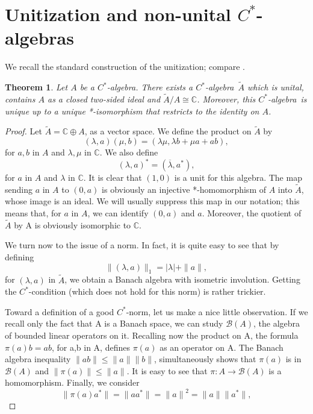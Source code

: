\documentclass{book}
\newtheorem{theorem}[definition]{Theorem}
\def\cstar{\(C^*\)-algebra}
\begin{document}
\section{Unitization and non-unital
\texorpdfstring{\(C^*\)}{C*}-algebras}
\label{sec:adjoiningUnit}
We recall the standard construction of the unitization; compare
\cite[Paragraph~A.1.2]{RordamLarsenLaustsen2000}.
\begin{theorem}\label{theorem:181}
  Let \(A\) be a \cstar. There exists a \cstar\ \(\tilde{A} \) which
  is unital, contains \(A\) as a closed two-sided ideal and \(\tilde{A}/A \cong \mathbb{C}\). Moreover,
  this \cstar\ is unique up to a unique *-isomorphism that restricts to the identity on \(A\).
\end{theorem}
\begin{proof}
  Let \(\tilde{A} = \mathbb{C}\oplus A\), as a vector space. We define the product on \(\tilde{A}\) by
  \[(\lambda, a)(\mu,b) = (\lambda\mu,\lambda b + \mu a +ab),\]
  for \(a,b\) in \(A\) and \(\lambda,\mu\) in \(\mathbb{C}\). We also define
  \[{(\lambda, a)}^* = (\overline{\lambda},a^*),\]
  for \(a\) in \(A\) and \(\lambda\) in \(\mathbb{C}\). It is clear that \((1,0)\) is a unit for this algebra. The
  map sending \(a\) in \(A\) to \((0,a)\) is obviously an injective *-homomorphism of
  \(A\) into \(\tilde{A}\), whose image is an ideal. We will usually suppress this map in
  our notation; this means that, for \(a\) in \(A\), we can identify \((0,a)\) and \(a\).
  Moreover, the quotient of \(\tilde{A}\) by A is obviously isomorphic to \(\mathbb{C}\).\par
  We turn now to the issue of a norm. In fact, it is quite easy to see that
  by defining
  \[\|(\lambda, a)\|_1 = |\lambda|+ \|a\| ,\]
  for \((\lambda,a)\) in \(\tilde{A}\), we obtain a Banach algebra with isometric involution. Getting
  the \(C^*\)-condition (which does not hold for this norm) is rather trickier.\par
  Toward a definition of a good \(C^*\)-norm, let us make a nice little observation. 
  If we recall only the fact that A is a Banach space, we can study \(\mathcal{B}(A)\),
  the algebra of bounded linear operators on it. Recalling now the product on
  A, the formula \(\pi(a)b = ab\), for a,b in A, defines \(\pi(a)\) as an operator on A.
  The Banach algebra inequality \(\|ab\| \leq \|a\| \|b\|\), simultaneously shows that
  \(\pi(a)\) is in \(\mathcal{B}(A)\) and \(\|\pi(a)\| \leq \|a\|\). It is easy to see that \(\pi : A \rightarrow \mathcal{B}(A)\) is a
  homomorphism. Finally, we consider
  \[\|\pi(a)a^*\| = \|aa^*\| = {\|a\|}^2 = \|a\| \|a^*\|,\]

\end{proof}
\end{document}
